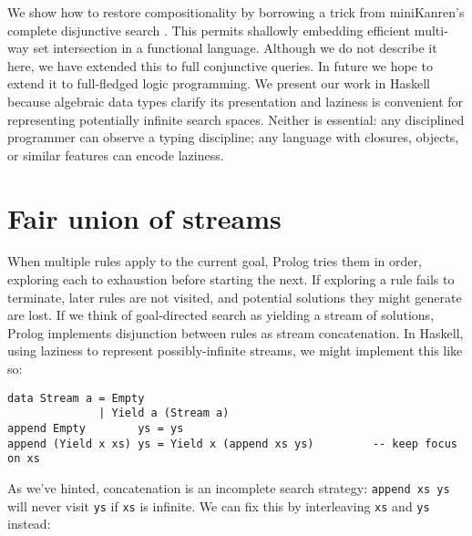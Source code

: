 \documentclass[acmsmall,screen,dvipsnames,svgnames]{acmart}
\newcommand\ttt\texttt
\newcommand\todo[1]{{\color{Orange}#1}}
\renewcommand\todo[1]{{\color{IndianRed}#1}}
\newcommand\XXX{\todo{XXX}}
\begin{document}
We show how to restore compositionality by borrowing a trick from miniKanren's complete disjunctive search%
.
%
This permits shallowly embedding efficient multi-way set intersection in a functional language.
Although we do not describe it here, we have extended this to full conjunctive queries.
In future we hope to extend it to full-fledged logic programming.
%
We present our work in Haskell because algebraic data types clarify its presentation and laziness is convenient for representing potentially infinite search spaces.
Neither is essential: any disciplined programmer can observe a typing discipline; any language with closures, objects, or similar features can encode laziness.



\section{Fair union of streams}

When multiple rules apply to the current goal, Prolog tries them in order, exploring each to exhaustion before starting the next.
If exploring a rule fails to terminate, later rules are not visited, and potential solutions they might generate are lost.
If we think of goal-directed search as yielding a stream of solutions, Prolog implements disjunction between rules as stream concatenation.
In Haskell, using laziness to represent possibly-infinite streams, we might implement this like so:

\begin{verbatim}
data Stream a = Empty
              | Yield a (Stream a)
append Empty        ys = ys
append (Yield x xs) ys = Yield x (append xs ys)         -- keep focus on xs
\end{verbatim}

\noindent
As we've hinted, concatenation is an incomplete search strategy: \ttt{append xs ys} will never visit \ttt{ys} if \ttt{xs} is infinite.
We can fix this by interleaving \ttt{xs} and \ttt{ys} instead:
\end{document}
